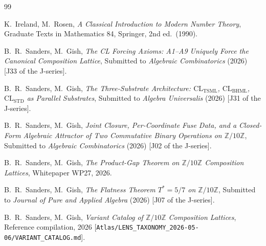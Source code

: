 \documentclass[11pt,reqno]{amsart}
\theoremstyle{plain}
\theoremstyle{definition}
\theoremstyle{remark}
\newcommand{\Z}{\mathbb{Z}}
\newcommand{\TSML}{\mathrm{TSML}}
\newcommand{\BHML}{\mathrm{BHML}}
\begin{document}
\begin{thebibliography}{99}

K.~Ireland, M.~Rosen,
\emph{A Classical Introduction to Modern Number Theory},
Graduate Texts in Mathematics 84, Springer, 2nd ed.\ (1990).

B.~R.~Sanders, M.~Gish,
\emph{The CL Forcing Axioms: A1--A9 Uniquely Force the Canonical Composition Lattice},
Submitted to \emph{Algebraic Combinatorics} (2026)
[J33 of the J-series].

B.~R.~Sanders, M.~Gish,
\emph{The Three-Substrate Architecture: $\mathrm{CL}_\TSML$, $\mathrm{CL}_\BHML$, $\mathrm{CL}_\mathrm{STD}$ as Parallel Substrates},
Submitted to \emph{Algebra Universalis} (2026)
[J31 of the J-series].

B.~R.~Sanders, M.~Gish,
\emph{Joint Closure, Per-Coordinate Fuse Data, and a Closed-Form Algebraic Attractor of Two Commutative Binary Operations on $\Z/10\Z$},
Submitted to \emph{Algebraic Combinatorics} (2026)
[J02 of the J-series].

B.~R.~Sanders, M.~Gish,
\emph{The Product-Gap Theorem on $\Z/10\Z$ Composition Lattices},
Whitepaper WP27, 2026.

B.~R.~Sanders, M.~Gish,
\emph{The Flatness Theorem $T^* = 5/7$ on $\Z/10\Z$},
Submitted to \emph{Journal of Pure and Applied Algebra} (2026)
[J07 of the J-series].

B.~R.~Sanders, M.~Gish,
\emph{Variant Catalog of $\Z/10\Z$ Composition Lattices},
Reference compilation, 2026
[\texttt{Atlas/LENS\_TAXONOMY\_2026-05-06/VARIANT\_CATALOG.md}].

\end{thebibliography}
\end{document}
